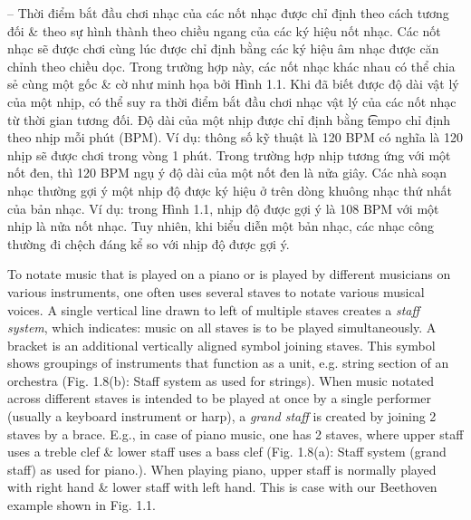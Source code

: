 \documentclass{article}
\begin{document}
\begin{itemize}
\begin{itemize}
\begin{itemize}
			-- Thời điểm bắt đầu chơi nhạc của các nốt nhạc được chỉ định theo cách tương đối \& theo sự hình thành theo chiều ngang của các ký hiệu nốt nhạc. Các nốt nhạc sẽ được chơi cùng lúc được chỉ định bằng các ký hiệu âm nhạc được căn chỉnh theo chiều dọc. Trong trường hợp này, các nốt nhạc khác nhau có thể chia sẻ cùng một gốc \& cờ như minh họa bởi {\sf Hình 1.1}. Khi đã biết được độ dài vật lý của một nhịp, có thể suy ra thời điểm bắt đầu chơi nhạc vật lý của các nốt nhạc từ thời gian tương đối. Độ dài của một nhịp được chỉ định bằng {\t tempo} chỉ định theo nhịp mỗi phút (BPM). Ví dụ: thông số kỹ thuật là 120 BPM có nghĩa là 120 nhịp sẽ được chơi trong vòng 1 phút. Trong trường hợp nhịp tương ứng với một nốt đen, thì 120 BPM ngụ ý độ dài của một nốt đen là nửa giây. Các nhà soạn nhạc thường gợi ý một nhịp độ được ký hiệu ở trên dòng khuông nhạc thứ nhất của bản nhạc. Ví dụ: trong {\sf Hình 1.1}, nhịp độ được gợi ý là 108 BPM với một nhịp là nửa nốt nhạc. Tuy nhiên, khi biểu diễn một bản nhạc, các nhạc công thường đi chệch đáng kể so với nhịp độ được gợi ý.
			
			To notate music that is played on a piano or is played by different musicians on various instruments, one often uses several staves to notate various musical voices. A single vertical line drawn to left of multiple staves creates a {\it staff system}, which indicates: music on all staves is to be played simultaneously. A bracket is an additional vertically aligned symbol joining staves. This symbol shows groupings of instruments that function as a unit, e.g. string section of an orchestra ({\sf Fig. 1.8(b): Staff system as used for strings}). When music notated across different staves is intended to be played at once by a single performer (usually a keyboard instrument or harp), a {\it grand staff} is created by joining 2 staves by a brace. E.g., in case of piano music, one has 2 staves, where upper staff uses a treble clef \& lower staff uses a bass clef ({\sf Fig. 1.8(a): Staff system (grand staff) as used for piano.}). When playing piano, upper staff is normally played with right hand \& lower staff with left hand. This is case with our Beethoven example shown in {\sf Fig. 1.1}.
			

\end{itemize}
\end{itemize}
\end{itemize}
\end{document}
